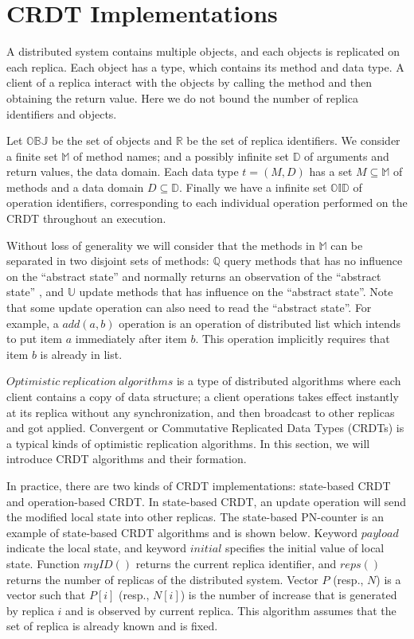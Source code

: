 
\section{CRDT Implementations}
\label{sec:CRDT implementations}

A distributed system contains multiple objects, and each objects is replicated on each replica. Each object has a type, which contains its method and data type. A client of a replica interact with the objects by calling the method and then obtaining the return value. Here we do not bound the number of replica identifiers and objects.

Let $\mathbb{OBJ}$ be the set of objects and $\mathbb{R}$ be the set of replica identifiers. We consider a finite set $\mathbb{M}$ of method names; and a possibly infinite set $\mathbb{D}$ of arguments and return values, the data domain. Each data type $t = (M,D)$ has a set $M \subseteq \mathbb{M}$ of methods and a data domain $D \subseteq \mathbb{D}$. Finally we have a infinite set $\mathbb{OID}$ of operation identifiers, corresponding to each individual operation performed on the CRDT throughout an execution.

Without loss of generality we will consider that the methods in $\mathbb{M}$ can be separated in two disjoint sets of methods: $\mathbb{Q}$ query methods that has no influence on the ``abstract state'' and normally returns an observation of the ``abstract state'' , and $\mathbb{U}$ update methods that has influence on the ``abstract state''. Note that some update operation can also need to read the ``abstract state''. For example, a $add(a,b)$ operation is an operation of distributed list which intends to put item $a$ immediately after item $b$. This operation implicitly requires that item $b$ is already in list.

$\mathit{Optimistic \ replication \ algorithms}$ is a type of distributed algorithms where each client contains a copy of data structure; a client operations takes effect instantly at its replica without any synchronization, and then broadcast to other replicas and got applied. Convergent or Commutative Replicated Data Types (CRDTs) is a typical kinds of optimistic replication algorithms. In this section, we will introduce CRDT algorithms and their formation.

In practice, there are two kinds of CRDT implementations: state-based CRDT and operation-based CRDT. In state-based CRDT, an update operation will send the modified local state into other replicas. The state-based PN-counter is an example of state-based CRDT algorithms and is shown below. Keyword $\mathit{payload}$ indicate the local state, and keyword $\mathit{initial}$ specifies the initial value of local state. Function $\mathit{myID}()$ returns the current replica identifier, and $\mathit{reps}()$ returns the number of replicas of the distributed system. Vector $P$ (resp., $N$) is a vector such that $P[i]$ (resp., $N[i]$) is the number of increase that is generated by replica $i$ and is observed by current replica. This algorithm assumes that the set of replica is already known and is fixed.

